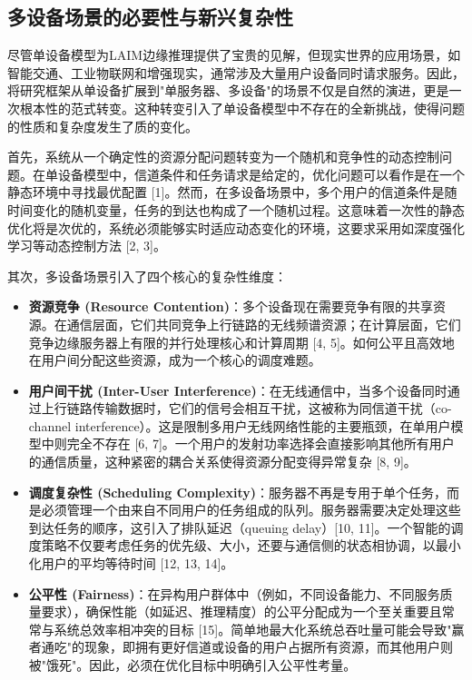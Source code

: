 \documentclass[11pt, a4paper]{article}
\begin{document}
\subsection{多设备场景的必要性与新兴复杂性}

尽管单设备模型为LAIM边缘推理提供了宝贵的见解，但现实世界的应用场景，如智能交通、工业物联网和增强现实，通常涉及大量用户设备同时请求服务。因此，将研究框架从单设备扩展到"单服务器、多设备"的场景不仅是自然的演进，更是一次根本性的范式转变。这种转变引入了单设备模型中不存在的全新挑战，使得问题的性质和复杂度发生了质的变化。

首先，系统从一个确定性的资源分配问题转变为一个随机和竞争性的动态控制问题。在单设备模型中，信道条件和任务请求是给定的，优化问题可以看作是在一个静态环境中寻找最优配置 [1]。然而，在多设备场景中，多个用户的信道条件是随时间变化的随机变量，任务的到达也构成了一个随机过程。这意味着一次性的静态优化将是次优的，系统必须能够实时适应动态变化的环境，这要求采用如深度强化学习等动态控制方法 [2, 3]。

其次，多设备场景引入了四个核心的复杂性维度：

\begin{itemize}
\item \textbf{资源竞争 (Resource Contention)}：多个设备现在需要竞争有限的共享资源。在通信层面，它们共同竞争上行链路的无线频谱资源；在计算层面，它们竞争边缘服务器上有限的并行处理核心和计算周期 [4, 5]。如何公平且高效地在用户间分配这些资源，成为一个核心的调度难题。

\item \textbf{用户间干扰 (Inter-User Interference)}：在无线通信中，当多个设备同时通过上行链路传输数据时，它们的信号会相互干扰，这被称为同信道干扰（co-channel interference）。这是限制多用户无线网络性能的主要瓶颈，在单用户模型中则完全不存在 [6, 7]。一个用户的发射功率选择会直接影响其他所有用户的通信质量，这种紧密的耦合关系使得资源分配变得异常复杂 [8, 9]。

\item \textbf{调度复杂性 (Scheduling Complexity)}：服务器不再是专用于单个任务，而是必须管理一个由来自不同用户的任务组成的队列。服务器需要决定处理这些到达任务的顺序，这引入了排队延迟（queuing delay）[10, 11]。一个智能的调度策略不仅要考虑任务的优先级、大小，还要与通信侧的状态相协调，以最小化用户的平均等待时间 [12, 13, 14]。

\item \textbf{公平性 (Fairness)}：在异构用户群体中（例如，不同设备能力、不同服务质量要求），确保性能（如延迟、推理精度）的公平分配成为一个至关重要且常常与系统总效率相冲突的目标 [15]。简单地最大化系统总吞吐量可能会导致"赢者通吃"的现象，即拥有更好信道或设备的用户占据所有资源，而其他用户则被"饿死"。因此，必须在优化目标中明确引入公平性考量。
\end{itemize}
\end{document}
